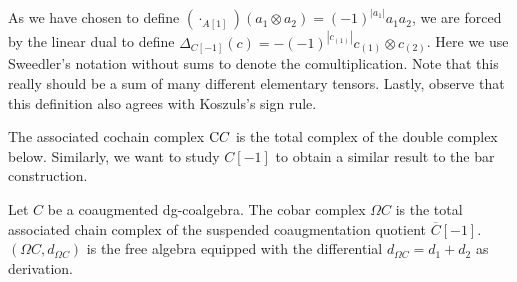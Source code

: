 \documentclass[../thesis.tex]{subfiles}
\begin{document}
            \begin{remark}
                As we have chosen to define $(\cdot_{A[1]})(a_1\otimes a_2)=(-1)^{|a_1|}a_1a_2$, we are forced by the linear dual to define $\Delta_{C[-1]}(c)=-(-1)^{|c_{(1)}|}c_{(1)}\otimes c_{(2)}$. Here we use Sweedler's notation without sums to denote the comultiplication. Note that this really should be a sum of many different elementary tensors. Lastly, observe that this definition also agrees with Koszuls's sign rule.
            \end{remark}

            The associated cochain complex $\tt{C}C$ is the total complex of the double complex below. Similarly, we want to study $C[-1]$ to obtain a similar result to the bar construction.

            \begin{center}
            \end{center}

            \begin{proposition}
                Let $C$ be a coaugmented dg-coalgebra. The cobar complex $\Omega C$ is the total associated chain complex of the suspended coaugmentation quotient $\overline{C}[-1]$. $(\Omega C, d_{\Omega C})$ is the free algebra equipped with the differential $d_{\Omega C} = d_1 + d_2$ as derivation.
            \end{proposition}
\end{document}
